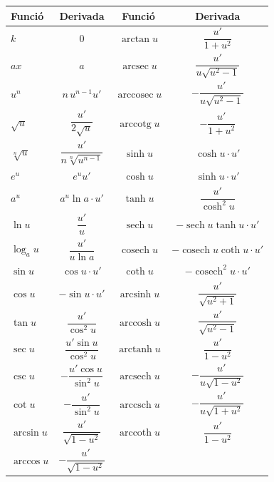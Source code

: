 \begin{table}[!htbp]
\centering
\renewcommand{\arraystretch}{1.75}
\begin{tabular}{lccc}
\toprule
Funció & Derivada & Funció & Derivada \\
\midrule
$k$ & $0$ & $\arctan u$ & $\displaystyle \dfrac{u'}{1+u^2}$ \\
$ax$ & $a$ & $\operatorname{arcsec} u$ & $\displaystyle \dfrac{u'}{u\sqrt{u^2-1}}$ \\
$u^n$ & $n\,u^{n-1}u'$ & $\operatorname{arccosec} u$ & $\displaystyle -\dfrac{u'}{u\sqrt{u^2-1}}$ \\
$\sqrt{u}$ & $\displaystyle \dfrac{u'}{2\sqrt{u}}$ & $\operatorname{arccotg} u$ & $\displaystyle -\dfrac{u'}{1+u^2}$ \\
$\sqrt[n]{u}$ & $\displaystyle \dfrac{u'}{n\sqrt[n]{u^{n-1}}}$ & $\sinh u$ & $\cosh u\cdot u'$ \\
$e^u$ & $e^u u'$ & $\cosh u$ & $\sinh u\cdot u'$ \\
$a^u$ & $a^u\ln a\cdot u'$ & $\tanh u$ & $\displaystyle \dfrac{u'}{\cosh^2 u}$ \\
$\ln u$ & $\displaystyle \dfrac{u'}{u}$ & $\operatorname{sech} u$ & $-\operatorname{sech} u\tanh u\cdot u'$ \\
$\log_a u$ & $\displaystyle \dfrac{u'}{u\ln a}$ & $\operatorname{cosech} u$ & $-\operatorname{cosech} u\coth u\cdot u'$ \\
$\sin u$ & $\cos u\cdot u'$ & $\coth u$ & $-\operatorname{cosech}^2 u\cdot u'$ \\
$\cos u$ & $-\sin u\cdot u'$ & $\operatorname{arcsinh} u$ & $\displaystyle \dfrac{u'}{\sqrt{u^2+1}}$ \\
$\tan u$ & $\displaystyle \dfrac{u'}{\cos^2 u}$ & $\operatorname{arccosh} u$ & $\displaystyle \dfrac{u'}{\sqrt{u^2-1}}$ \\
$\sec u$ & $\displaystyle \dfrac{u'\sin u}{\cos^2 u}$ & $\operatorname{arctanh} u$ & $\displaystyle \dfrac{u'}{1-u^2}$ \\
$\csc u$ & $\displaystyle -\dfrac{u'\cos u}{\sin^2 u}$ & $\operatorname{arcsech} u$ & $\displaystyle -\dfrac{u'}{u\sqrt{1-u^2}}$ \\
$\cot u$ & $\displaystyle -\dfrac{u'}{\sin^2 u}$ & $\operatorname{arccsch} u$ & $\displaystyle -\dfrac{u'}{u\sqrt{1+u^2}}$ \\
$\arcsin u$ & $\displaystyle \dfrac{u'}{\sqrt{1-u^2}}$ & $\operatorname{arccoth} u$ & $\displaystyle \dfrac{u'}{1-u^2}$ \\
$\arccos u$ & $\displaystyle -\dfrac{u'}{\sqrt{1-u^2}}$ &  &  \\
\bottomrule
\end{tabular}
\end{table}

